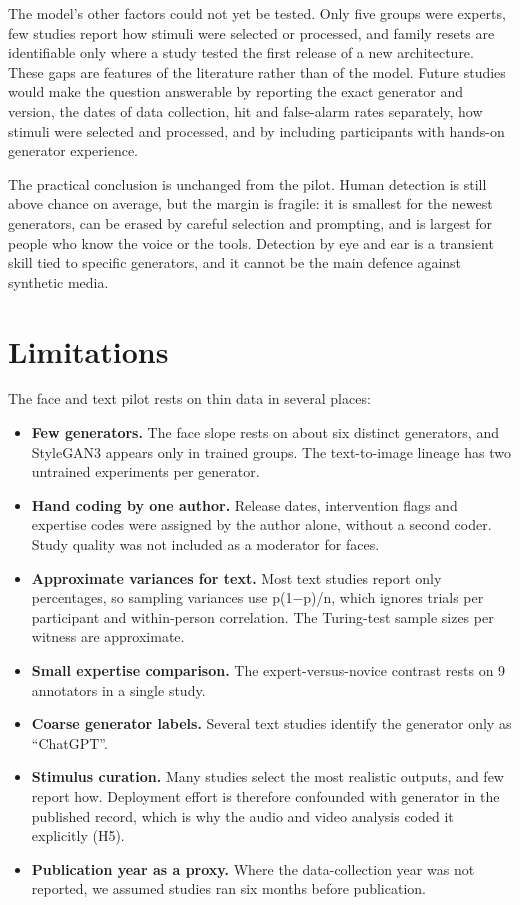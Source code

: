 \documentclass[11pt]{article}
\providecommand{\tightlist}{\setlength{\itemsep}{0pt}\setlength{\parskip}{0pt}}
\begin{document}
The model's other factors could not yet be tested. Only five groups were
experts, few studies report how stimuli were selected or processed, and
family resets are identifiable only where a study tested the first
release of a new architecture. These gaps are features of the literature
rather than of the model. Future studies would make the question
answerable by reporting the exact generator and version, the dates of
data collection, hit and false-alarm rates separately, how stimuli were
selected and processed, and by including participants with hands-on
generator experience.

The practical conclusion is unchanged from the pilot. Human detection is
still above chance on average, but the margin is fragile: it is smallest
for the newest generators, can be erased by careful selection and
prompting, and is largest for people who know the voice or the tools.
Detection by eye and ear is a transient skill tied to specific
generators, and it cannot be the main defence against synthetic media.

\hypertarget{limitations}{%
\section{Limitations}\label{limitations}}

The face and text pilot rests on thin data in several places:

\begin{itemize}
\tightlist
\item
  \textbf{Few generators.} The face slope rests on about six distinct
  generators, and StyleGAN3 appears only in trained groups. The
  text-to-image lineage has two untrained experiments per generator.
\item
  \textbf{Hand coding by one author.} Release dates, intervention flags
  and expertise codes were assigned by the author alone, without a
  second coder. Study quality was not included as a moderator for faces.
\item
  \textbf{Approximate variances for text.} Most text studies report only
  percentages, so sampling variances use p(1−p)/n, which ignores trials
  per participant and within-person correlation. The Turing-test sample
  sizes per witness are approximate.
\item
  \textbf{Small expertise comparison.} The expert-versus-novice contrast
  rests on 9 annotators in a single study.
\item
  \textbf{Coarse generator labels.} Several text studies identify the
  generator only as ``ChatGPT''.
\item
  \textbf{Stimulus curation.} Many studies select the most realistic
  outputs, and few report how. Deployment effort is therefore confounded
  with generator in the published record, which is why the audio and
  video analysis coded it explicitly (H5).
\item
  \textbf{Publication year as a proxy.} Where the data-collection year
  was not reported, we assumed studies ran six months before
  publication.
\end{itemize}
\end{document}
